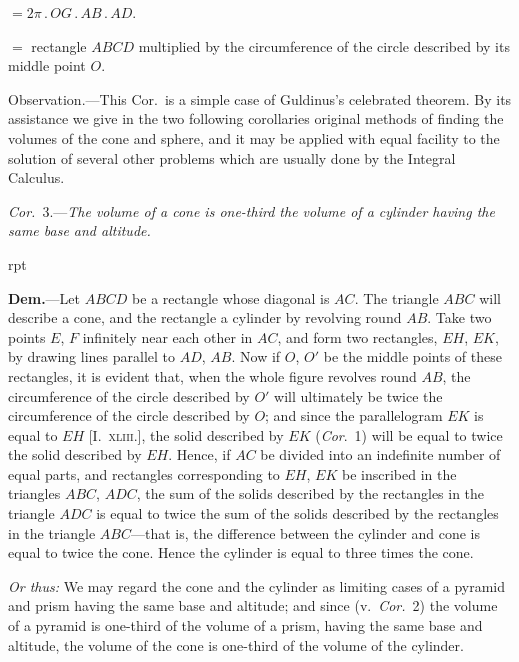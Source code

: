 \documentclass[oneside]{book}
\newcommand\imgflow[3]{
\setcounter{wrapwidth}{#1}
\begin{wrapfigure}[#2]{r}{\value{wrapwidth}pt}
\begin{center}
\vspace{-0.3in}
\end{center}
\end{wrapfigure}
}
\begin{document}
\hspace{.25\textwidth}$= 2\pi\,.\,OG\,.\,AB\,.\,AD$.

\hspace{.25\textwidth}$=$ rectangle $ABCD$ multiplied by the
circumference of the circle described by its middle
point $O$.

\smallskip
\begin{footnotesize}
\textsf{Observation.}---This Cor.\ is a simple case of Guldinus's celebrated
theorem. By its assistance we give in the two following
corollaries original methods of finding the volumes of the cone and
sphere, and it may be applied with equal facility to the solution
of several other problems which are usually done by the Integral
Calculus.
\par\end{footnotesize}

\smallskip
\emph{Cor.}~3.---\textit{The volume of a cone is one-third the volume
of a cylinder having the same base and altitude.}

\imgflow{160}{9}{f246}

\textbf{Dem.}---Let $ABCD$ be a rectangle whose diagonal is
$AC$. The triangle $ABC$ will describe a cone, and the
rectangle a cylinder by revolving round $AB$. Take two
points $E$, $F$ infinitely
near each other in $AC$,
and form two rectangles,
$EH$, $EK$, by drawing
lines parallel to $AD$, $AB$.
Now if $O$, $O'$ be the
middle points of these
rectangles, it is evident
that, when the whole
figure revolves round $AB$, the circumference of the
circle described by $O'$ will ultimately be twice the circumference
of the circle described by $O$; and since the
parallelogram $EK$ is equal to $EH$ [I.~\textsc{xliii}.], the solid
described by $EK$ (\emph{Cor}.~1) will be equal to twice the
solid described by $EH$. Hence, if $AC$ be divided into
an indefinite number of equal parts, and rectangles
corresponding to $EH$, $EK$ be inscribed in the triangles
$ABC$, $ADC$, the sum of the solids described by the
rectangles in the triangle $ADC$ is equal to twice the
sum of the solids described by the rectangles in the
triangle $ABC$---that is, the difference between the
cylinder and cone is equal to twice the cone. Hence
the cylinder is equal to three times the cone.

\begin{footnotesize}
\emph{Or thus:} We may regard the cone and the cylinder as limiting
cases of a pyramid and prism having the same base and altitude;
and since (v.\ \emph{Cor.}~2) the volume of a pyramid is one-third of the
volume of a prism, having the same base and altitude, the volume
of the cone is one-third of the volume of the cylinder.
\par\end{footnotesize}
\end{document}
